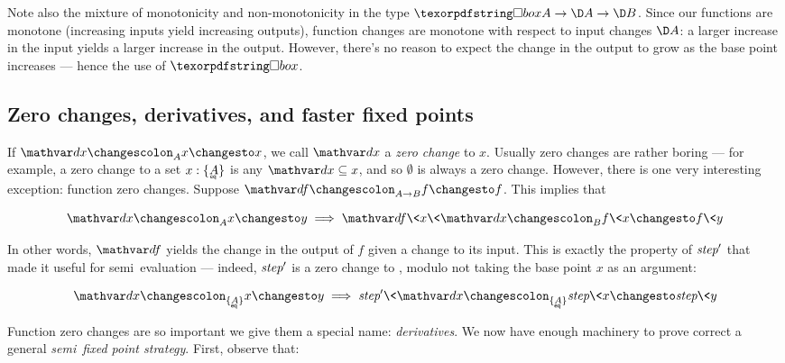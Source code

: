 

Note also the mixture of monotonicity and non-monotonicity in the type $\iso A
\to \D A \to \D B$. Since our functions are monotone (increasing inputs yield
increasing outputs), function changes are monotone with respect to input changes
$\D A$: a larger increase in the input yields a larger increase in the output.
However, there's no reason to expect the change in the output to grow as the
base point increases --- hence the use of $\iso$.


\subsection{Zero changes, derivatives, and faster fixed points}
\label{sec:derivatives}

If $\changesat A \dx x x$, we call $\dx$ a \emph{zero change} to $x$. Usually
zero changes are rather boring --- for example, a zero change to a set $x :
\tseteq{A}$ is any $\dx \subseteq x$, and so $\emptyset$ is always a zero
change.
%
However, there is one very interesting exception: function zero changes. Suppose
$\changesat{A \to B}{\df}{f}{f}$. This implies that

\begin{equation*}
  \changesat A \dx x y \implies \changesat B{\df\<x\<\dx}{f\<x}{f\<y}
\end{equation*}

\noindent
In other words, $\df$ yields the change in the output of $f$ given a change to
its input.
%
This is exactly the property of $\text{\itshape step}'$ that made it useful for
semi\naive\ evaluation --- indeed, $\text{\itshape step}'$ is a zero change to
, modulo not taking the base point $x$ as an argument:

\[ \changesat{\tseteq A} \dx x y \implies
\changesat{\tseteq A}{\name{step}'\<\dx}{\name{step}\<x}{\name{step}\<y}
\]

\noindent
Function zero changes are so important we give them a special name:
\emph{derivatives}. We now have enough machinery to prove correct a
general \emph{semi\naive\ fixed point strategy}. First, observe that:

